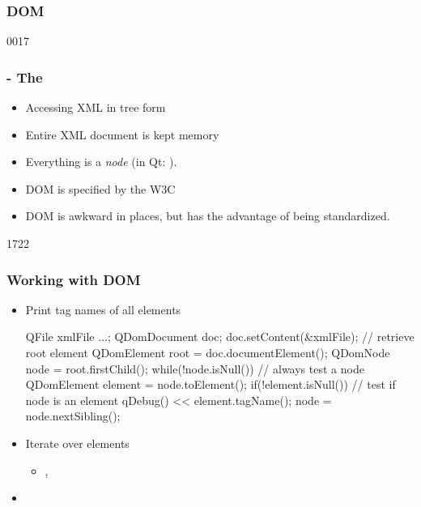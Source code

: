 \subsubsection{DOM}
\begin{slide}[fragile]{0017}
\label{qdom}
        \frametitle{ - The }\label{qdom}
\begin{itemize}
  \item Accessing XML in tree form
  \item Entire XML document is kept memory
  \item Everything is a \emph{node} (in Qt: ).
  \item DOM is specified by the W3C
  \item DOM is awkward in places, but has the advantage of being standardized.
  \end{itemize}
\end{slide}
\begin{slide}[fragile]{1722}\frametitle{Working with DOM}
\begin{itemize}
\item Print tag names of all elements
   \begin{cpp}
QFile xmlFile ...;
QDomDocument doc;      
doc.setContent(&xmlFile);
// retrieve root element
QDomElement root = doc.documentElement();
QDomNode node = root.firstChild();
while(!node.isNull()) { // always test a node
  QDomElement element = node.toElement();
  if(!element.isNull()) { // test if node is an element
    qDebug() << element.tagName();
  }
  node = node.nextSibling();
}
    \end{cpp}
  \item Iterate over elements
    \begin{itemize}
    \item {}, 
    \end{itemize}
  \item {}
  \end{itemize}
\end{slide}
